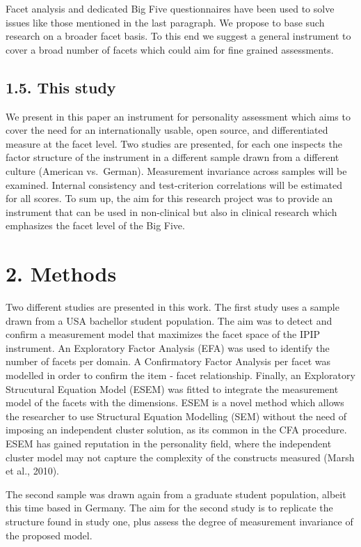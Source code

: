 \documentclass[,man,floatsintext]{apa6}
\theoremstyle{definition}
\theoremstyle{definition}
\theoremstyle{definition}
\theoremstyle{remark}
\begin{document}
Facet analysis and dedicated Big Five questionnaires have been used to
solve issues like those mentioned in the last paragraph. We propose to
base such research on a broader facet basis. To this end we suggest a
general instrument to cover a broad number of facets which could aim for
fine grained assessments.

\hypertarget{this-study}{%
\subsection{1.5. This study}\label{this-study}}

We present in this paper an instrument for personality assessment which
aims to cover the need for an internationally usable, open source, and
differentiated measure at the facet level. Two studies are presented,
for each one inspects the factor structure of the instrument in a
different sample drawn from a different culture (American vs.~German).
Measurement invariance across samples will be examined. Internal
consistency and test-criterion correlations will be estimated for all
scores. To sum up, the aim for this research project was to provide an
instrument that can be used in non-clinical but also in clinical
research which emphasizes the facet level of the Big Five.

\hypertarget{methods}{%
\section{2. Methods}\label{methods}}

Two different studies are presented in this work. The first study uses a
sample drawn from a USA bachellor student population. The aim was to
detect and confirm a measurement model that maximizes the facet space of
the IPIP instrument. An Exploratory Factor Analysis (EFA) was used to
identify the number of facets per domain. A Confirmatory Factor Analysis
per facet was modelled in order to confirm the item - facet
relationship. Finally, an Exploratory Strucutural Equation Model (ESEM)
was fitted to integrate the measurement model of the facets with the
dimensions. ESEM is a novel method which allows the researcher to use
Structural Equation Modelling (SEM) without the need of imposing an
independent cluster solution, as its common in the CFA procedure. ESEM
has gained reputation in the personality field, where the independent
cluster model may not capture the complexity of the constructs measured
(Marsh et al., 2010).

The second sample was drawn again from a graduate student population,
albeit this time based in Germany. The aim for the second study is to
replicate the structure found in study one, plus assess the degree of
measurement invariance of the proposed model.
\end{document}
